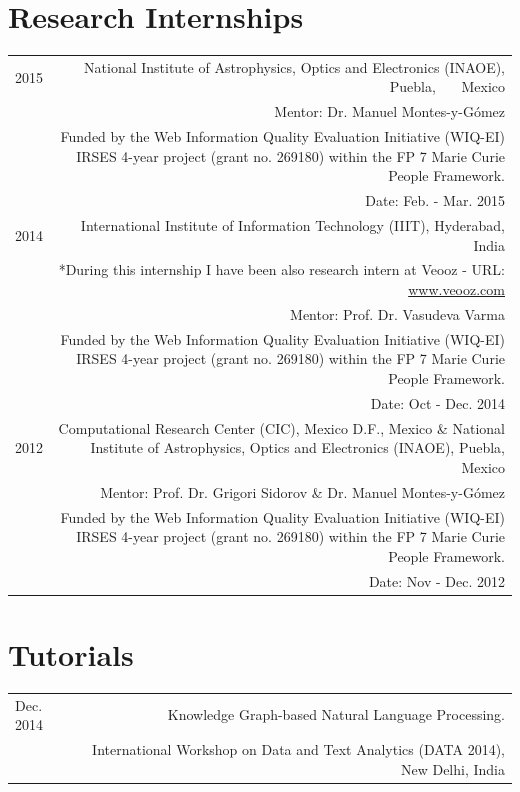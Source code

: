 \documentclass[10pt]{article}
\begin{document}
\section*{Research Internships}
\begin{tabular}{L!{\VRule}R}
2015&National Institute of Astrophysics, Optics and Electronics (INAOE), Puebla, ~~~Mexico\\
&\scriptsize{Mentor: Dr. Manuel Montes-y-G{\'o}mez}\\          
&\scriptsize{Funded by the  Web Information Quality Evaluation Initiative (WIQ-EI) IRSES 4-year project (grant no. 269180) within the FP 7 Marie Curie People Framework.}\\
&\scriptsize{Date: Feb. - Mar. 2015}\vspace{5pt}\\
2014&International Institute of Information Technology (IIIT), Hyderabad, India\\
&\scriptsize{*During this internship I have been also research intern at Veooz - URL: \url{www.veooz.com} }\\
&\scriptsize{Mentor: Prof. Dr. Vasudeva Varma}\\          
&\scriptsize{Funded by the  Web Information Quality Evaluation Initiative (WIQ-EI) IRSES 4-year project (grant no. 269180) within the FP 7 Marie Curie People Framework.}\\
&\scriptsize{Date: Oct - Dec. 2014}\vspace{5pt}\\
2012&Computational Research Center (CIC), Mexico D.F., Mexico \& National Institute of Astrophysics, Optics and Electronics (INAOE), Puebla, Mexico\\
&\scriptsize{Mentor: Prof. Dr. Grigori Sidorov \& Dr. Manuel Montes-y-G{\'o}mez}\\          
&\scriptsize{Funded by the  Web Information Quality Evaluation Initiative (WIQ-EI) IRSES 4-year project (grant no. 269180) within the FP 7 Marie Curie People Framework.}\\
&\scriptsize{Date: Nov - Dec. 2012}\vspace{5pt}\\
\end{tabular}

\section*{Tutorials}
\begin{tabular}{L!{\VRule}R}
Dec. 2014&Knowledge Graph-based Natural Language Processing.\\
&\scriptsize{International Workshop on Data and Text Analytics (DATA 2014), New Delhi, India} \vspace{5pt}\\
\end{tabular}
\end{document}
